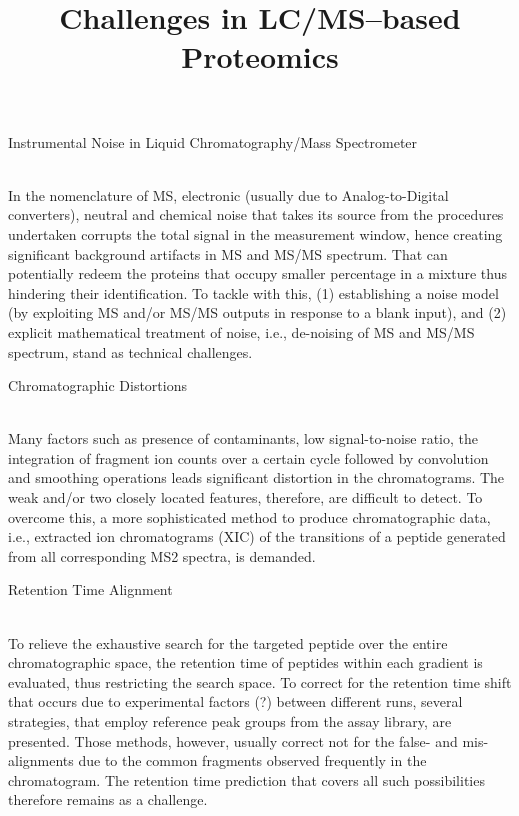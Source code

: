 \documentclass{nature}
\title{Challenges in LC/MS--based Proteomics}%
\begin{document}
\maketitle
\begin{enumerate}
    {\bf \item Instrumental Noise in Liquid Chromatography/Mass Spectrometer}\\
    In the nomenclature of MS, electronic (usually due to Analog-to-Digital converters), neutral and chemical noise that takes its source from the procedures undertaken corrupts the total signal in the measurement window, hence creating significant background artifacts in MS and MS/MS spectrum. That can potentially redeem the proteins that occupy smaller percentage in a mixture thus hindering their identification. To tackle with this, (1) establishing a noise model (by exploiting MS and/or MS/MS outputs in response to a blank input), and (2) explicit mathematical treatment of noise, i.e., de-noising of MS and MS/MS spectrum, stand as technical challenges.
    
    {\bf \item Chromatographic Distortions}\\
    Many factors such as presence of contaminants, low signal-to-noise ratio, the integration of fragment ion counts over a certain cycle followed by convolution and smoothing operations leads significant distortion in the chromatograms. The weak and/or two closely located features, therefore, are difficult to detect. To overcome this, a more sophisticated method to produce chromatographic data, i.e., extracted ion chromatograms (XIC) of the transitions of a peptide generated from all corresponding MS2 spectra, is demanded. 
    
    
    {\bf \item Retention Time Alignment}\\
    To relieve the exhaustive search for the targeted peptide over the entire chromatographic space, the retention time of peptides within each gradient is evaluated, thus restricting the search space. To correct for the retention time shift that occurs due to experimental factors (?) between different runs, several strategies, that employ reference peak groups from the assay library, are presented. Those methods, however, usually correct not for the false- and mis-alignments due to the common fragments observed frequently in the chromatogram. The retention time prediction that covers all such possibilities therefore remains as a challenge.
    

\end{enumerate}
\end{document}
